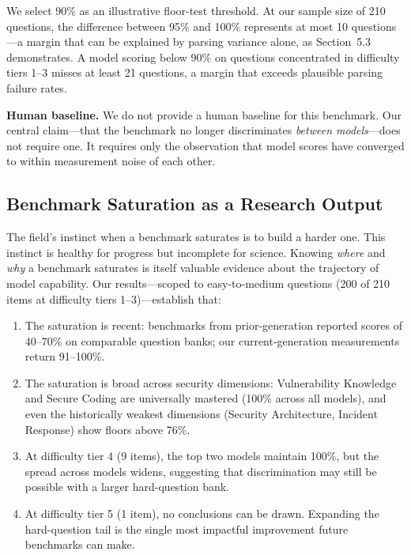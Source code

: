 \documentclass[final]{elsarticle}
\begin{document}
We select 90\% as an illustrative floor-test threshold. At our sample size of 210 questions, the difference between 95\% and 100\% represents at most 10 questions---a margin that can be explained by parsing variance alone, as Section~5.3 demonstrates. A model scoring below 90\% on questions concentrated in difficulty tiers 1--3 misses at least 21 questions, a margin that exceeds plausible parsing failure rates.

\textbf{Human baseline.} We do not provide a human baseline for this benchmark. Our central claim---that the benchmark no longer discriminates \emph{between models}---does not require one. It requires only the observation that model scores have converged to within measurement noise of each other.

\subsection{Benchmark Saturation as a Research Output}

The field's instinct when a benchmark saturates is to build a harder one. This instinct is healthy for progress but incomplete for science. Knowing \emph{where} and \emph{why} a benchmark saturates is itself valuable evidence about the trajectory of model capability. Our results---scoped to easy-to-medium questions (200 of 210 items at difficulty tiers 1--3)---establish that:

\begin{enumerate}
    \item The saturation is recent: benchmarks from prior-generation reported scores of 40--70\% on comparable question banks; our current-generation measurements return 91--100\%.
    \item The saturation is broad across security dimensions: Vulnerability Knowledge and Secure Coding are universally mastered (100\% across all models), and even the historically weakest dimensions (Security Architecture, Incident Response) show floors above 76\%.
    \item At difficulty tier 4 (9 items), the top two models maintain 100\%, but the spread across models widens, suggesting that discrimination may still be possible with a larger hard-question bank.
    \item At difficulty tier 5 (1 item), no conclusions can be drawn. Expanding the hard-question tail is the single most impactful improvement future benchmarks can make.
\end{enumerate}
\end{document}
